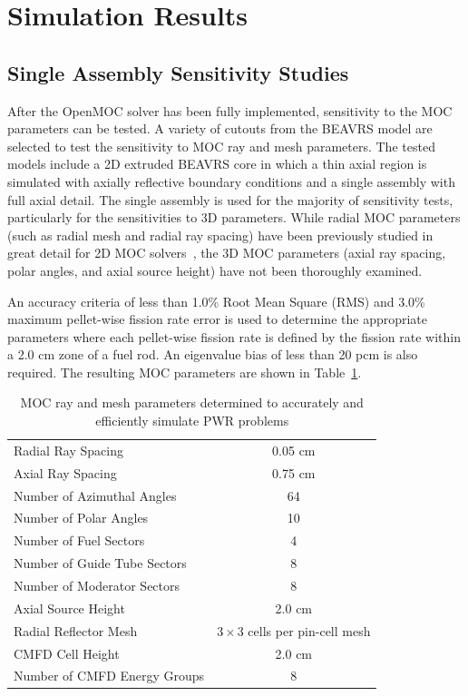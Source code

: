 \documentclass[12pt,twoside]{mitthesis-exec}
\begin{document}
\section*{Simulation Results}

\subsection*{Single Assembly Sensitivity Studies}

After the OpenMOC solver has been fully implemented, sensitivity to the MOC parameters can be tested. A variety of cutouts from the BEAVRS model are selected to test the sensitivity to MOC ray and mesh parameters. The tested models include a 2D extruded BEAVRS core in which a thin axial region is simulated with axially reflective boundary conditions and a single assembly with full axial detail. The single assembly is used for the majority of sensitivity tests, particularly for the sensitivities to 3D parameters. While radial MOC parameters (such as radial mesh and radial ray spacing) have been previously studied in great detail for 2D MOC solvers~\cite{rhodes2006casmo}, the 3D MOC parameters (axial ray spacing, polar angles, and axial source height) have not been thoroughly examined. 

An accuracy criteria of less than 1.0\% Root Mean Square (RMS) and 3.0\% maximum pellet-wise fission rate error is used to determine the appropriate parameters where each pellet-wise fission rate is defined by the fission rate within a 2.0 cm zone of a fuel rod. An eigenvalue bias of less than 20 pcm is also required. The resulting MOC parameters are shown in Table~\ref{tab:final-params}.

\begin{table}[ht]
	\centering
	\caption{MOC ray and mesh parameters determined to accurately and efficiently simulate PWR problems}
	\medskip
	\begin{tabular}{lc}
		\hline
		Radial Ray Spacing & 0.05 cm \\
		Axial Ray Spacing & 0.75 cm \\
		Number of Azimuthal Angles & 64 \\
		Number of Polar Angles & 10 \\
		\hline
		Number of Fuel Sectors & 4 \\
		Number of Guide Tube Sectors & 8 \\
		Number of Moderator Sectors & 8 \\
		Axial Source Height & 2.0 cm \\
		Radial Reflector Mesh & $3\times 3$ cells per pin-cell mesh \\
		\hline
		CMFD Cell Height & 2.0 cm \\
		Number of CMFD Energy Groups & 8 \\
		\hline
	\end{tabular}
	\label{tab:final-params}
\end{table}
\end{document}
